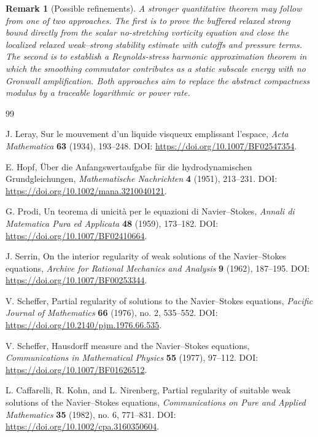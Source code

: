 \documentclass[pdflatex,sn-mathphys-num]{sn-jnl}
\numberwithin{equation}{section}
\theoremstyle{thmstyleone}
\theoremstyle{thmstylethree}
\newtheorem{remark}[theorem]{Remark}
\begin{document}
\begin{remark}[Possible refinements]
A stronger quantitative theorem may follow from one of two approaches.  The first is to prove the buffered relaxed strong bound directly from the scalar no-stretching vorticity equation and close the localized relaxed weak--strong stability estimate with cutoffs and pressure terms.  The second is to establish a Reynolds-stress harmonic approximation theorem in which the smoothing commutator contributes as a static subscale energy with no Gronwall amplification.  Both approaches aim to replace the abstract compactness modulus by a traceable logarithmic or power rate.
\end{remark}

\backmatter



\begin{thebibliography}{99}
	
	J. Leray,
	Sur le mouvement d'un liquide visqueux emplissant l'espace,
	\emph{Acta Mathematica} \textbf{63} (1934), 193--248.
	\newblock DOI: \url{https://doi.org/10.1007/BF02547354}.
	
	E. Hopf,
	\"Uber die Anfangswertaufgabe f\"ur die hydrodynamischen Grundgleichungen,
	\emph{Mathematische Nachrichten} \textbf{4} (1951), 213--231.
	\newblock DOI: \url{https://doi.org/10.1002/mana.3210040121}.
	
	G. Prodi,
	Un teorema di unicit\`a per le equazioni di Navier--Stokes,
	\emph{Annali di Matematica Pura ed Applicata} \textbf{48} (1959), 173--182.
	\newblock DOI: \url{https://doi.org/10.1007/BF02410664}.
	
	J. Serrin,
	On the interior regularity of weak solutions of the Navier--Stokes equations,
	\emph{Archive for Rational Mechanics and Analysis} \textbf{9} (1962), 187--195.
	\newblock DOI: \url{https://doi.org/10.1007/BF00253344}.
	

	V. Scheffer,
	Partial regularity of solutions to the Navier--Stokes equations,
	\emph{Pacific Journal of Mathematics} \textbf{66} (1976), no. 2, 535--552.
	\newblock DOI: \url{https://doi.org/10.2140/pjm.1976.66.535}.
	
	V. Scheffer,
	Hausdorff measure and the Navier--Stokes equations,
	\emph{Communications in Mathematical Physics} \textbf{55} (1977), 97--112.
	\newblock DOI: \url{https://doi.org/10.1007/BF01626512}.
	
	L. Caffarelli, R. Kohn, and L. Nirenberg,
	Partial regularity of suitable weak solutions of the Navier--Stokes equations,
	\emph{Communications on Pure and Applied Mathematics} \textbf{35} (1982), no. 6, 771--831.
	\newblock DOI: \url{https://doi.org/10.1002/cpa.3160350604}.
	

\end{thebibliography}
\end{document}
